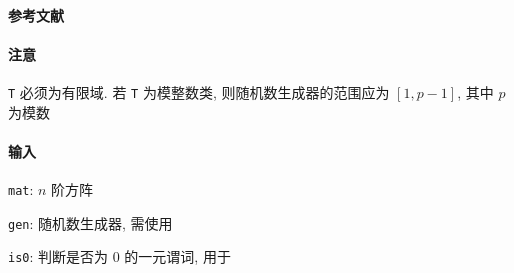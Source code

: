 \paragraph{参考文献} \cite{wiedemann1986solving}

\paragraph{注意} \verb|T| 必须为有限域. 若 \verb|T| 为模整数类, 则随机数生成器的范围应为 \([1, p-1]\), 其中 \(p\) 为模数

\paragraph{输入}

\verb|mat|: \(n\) 阶方阵

\verb|gen|: 随机数生成器, 需使用 

\verb|is0|: 判断是否为 \(0\) 的一元谓词, 用于 
